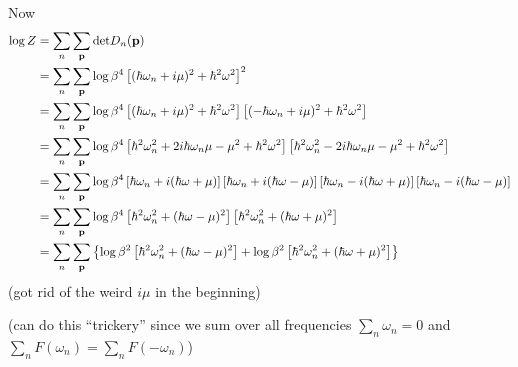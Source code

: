 Now
\begin{equation}
\begin{split}
	\log Z & = \sum_n \sum_{\mathbf{p}} \text{det} D_n(\mathbf{p}) \\
	       & = \sum_n \sum_{\mathbf{p}} \log \beta^4 \left[ (\hbar \omega_n + i \mu)^2 + \hbar^2 \omega^2 \right]^2 \\
	       & = \sum_n \sum_{\mathbf{p}} \log \beta^4 \left[ (\hbar \omega_n + i \mu)^2 + \hbar^2 \omega^2 \right] \left[ (-\hbar \omega_n + i \mu)^2 + \hbar^2 \omega^2 \right] \\
	       & = \sum_n \sum_{\mathbf{p}} \log \beta^4 \left[ \hbar^2 \omega_n^2 + 2 i \hbar \omega_n \mu - \mu^2 + \hbar^2 \omega^2 \right] \left[ \hbar^2 \omega_n^2 - 2 i \hbar \omega_n \mu - \mu^2 + \hbar^2 \omega^2 \right] \\
	       & = \sum_n \sum_{\mathbf{p}} \log \beta^4 \left[ \hbar \omega_n + i (\hbar \omega + \mu) \right] 
		                                        \left[ \hbar \omega_n + i (\hbar \omega - \mu) \right]
		                                        \left[ \hbar \omega_n - i (\hbar \omega + \mu) \right]
		                                        \left[ \hbar \omega_n - i (\hbar \omega - \mu) \right] \\
	       & = \sum_n \sum_{\mathbf{p}} \log \beta^4 \left[ \hbar^2 \omega_n^2 + (\hbar \omega - \mu)^2 \right] 
		                                        \left[ \hbar^2 \omega_n^2 + (\hbar \omega + \mu)^2 \right] \\
	       & = \sum_n \sum_{\mathbf{p}} \left\{ \log \beta^2 \left[ \hbar^2 \omega_n^2 + (\hbar \omega - \mu)^2 \right] +
		                                   \log \beta^2 \left[ \hbar^2 \omega_n^2 + (\hbar \omega + \mu)^2 \right] \right\}
\end{split}
\end{equation}
(got rid of the weird $i \mu$ in the beginning)

(can do this ``trickery'' since we sum over all frequencies $\sum_n \omega_n = 0$ and $\sum_n F(\omega_n) = \sum_n F(-\omega_n)$)

